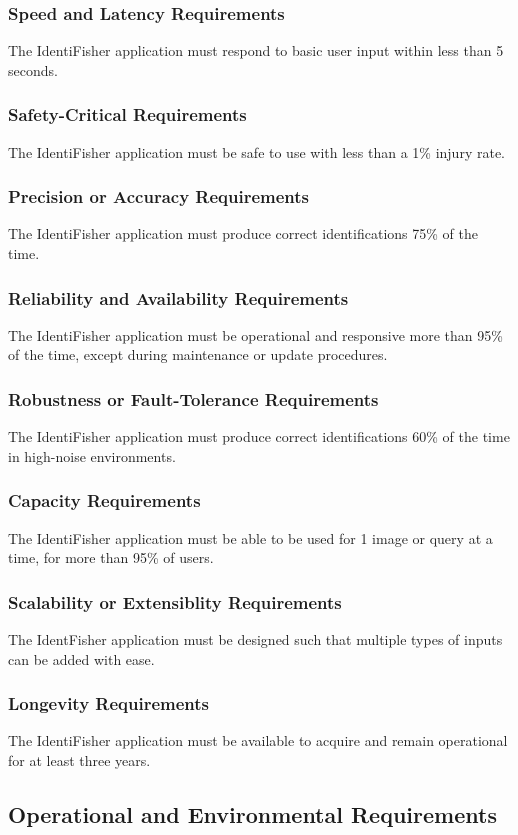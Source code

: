 \documentclass{article}
\begin{document}
\subsubsection{Speed and Latency Requirements}
The IdentiFisher application must respond to basic user input within less than 5 seconds.
\subsubsection{Safety-Critical Requirements}
The IdentiFisher application must be safe to use with less than a 1\% injury rate.
\subsubsection{Precision or Accuracy Requirements}
The IdentiFisher application must produce correct identifications 75\% of the time.
\subsubsection{Reliability and Availability Requirements}
The IdentiFisher application must be operational and responsive more than 95\% of the time, except during maintenance or update procedures.
\subsubsection{Robustness or Fault-Tolerance Requirements}
The IdentiFisher application must produce correct identifications 60\% of the time in high-noise environments.
\subsubsection{Capacity Requirements}
The IdentiFisher application must be able to be used for 1 image or query at a time, for more than 95\% of users.
\subsubsection{Scalability or Extensiblity Requirements}
The IdentFisher application must be designed such that multiple types of inputs can be added with ease.
\subsubsection{Longevity Requirements}
The IdentiFisher application must be available to acquire and remain operational for at least three years.

\subsection{Operational and Environmental Requirements}
\end{document}
